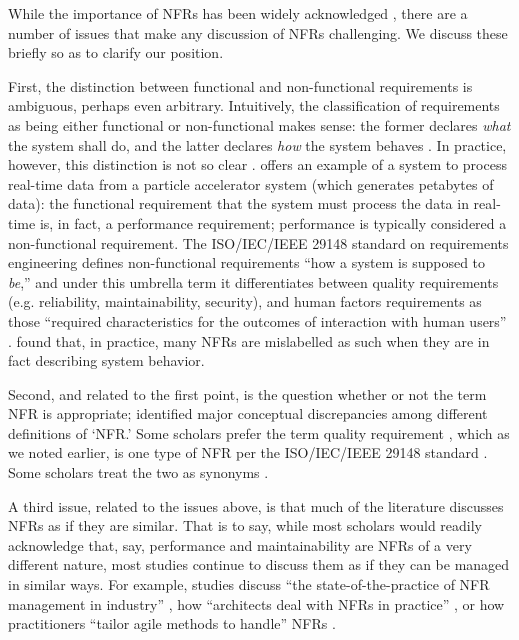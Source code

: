\documentclass[smallextended]{svjour3}       %
\begin{document}
While the importance of NFRs has been widely acknowledged \citep{glinz_non-functional_2007,mairiza2010investigation,borg2003bad}, there are a number of issues that make any discussion of NFRs challenging. We discuss these briefly so as to clarify our position.

First, the distinction between functional and non-functional requirements is ambiguous, perhaps even arbitrary. Intuitively, the classification of requirements as being either functional or non-functional makes sense: the former declares \textit{what} the system shall do, and the latter declares \textit{how} the system behaves \citep[p. 328]{eckhardt2016non,dorfman1990standards}. In practice, however, this distinction is not so clear \citep{eckhardt2016non}. \cite{glinz_non-functional_2007} offers an example of a system to process real-time data from a particle accelerator system (which generates petabytes of data): the functional requirement that the system must process the data in real-time is, in fact, a performance requirement; performance is typically considered a non-functional requirement.
The ISO/IEC/IEEE 29148 standard on requirements engineering defines non-functional requirements ``how a system is supposed to \textit{be},'' and under this umbrella term it differentiates between quality requirements (e.g. reliability, maintainability, security), and human factors requirements as those ``required characteristics for the outcomes of interaction with human users'' \cite[p. 14]{restandard}. 
\citet{eckhardt2016non} found that, in practice, many NFRs are mislabelled as such when they are in fact describing system behavior. 


Second, and related to the first point, is the question whether or not the term NFR is appropriate; \cite{glinz_non-functional_2007} identified major conceptual discrepancies among different definitions of `NFR.' 
Some scholars prefer the term quality requirement \citep{pohl2016requirements,svensson2010managing}, which as we noted earlier, is one type of NFR per the ISO/IEC/IEEE 29148 standard \citep{restandard}. 
Some scholars treat the two as synonyms \citep[e.g.][]{capilla2012quality}.

A third issue, related to the issues above, is that much of the literature discusses NFRs as if they are similar. That is to say, while most scholars would readily acknowledge that, say, performance and maintainability are NFRs of a very different nature, most studies continue to discuss them as if they can be managed in similar ways. 
For example, studies discuss ``the state-of-the-practice of NFR management in industry'' \citep{borg2003bad}, how ``architects deal with NFRs in practice'' \citep{ameller_how_2012}, or how practitioners ``tailor agile methods to handle'' NFRs \citep{rahy2022managing}. 
\end{document}
